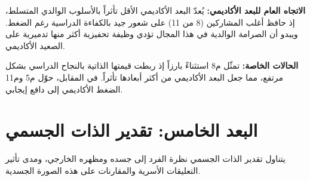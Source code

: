 \documentclass[12pt,oneside]{report}
\begin{document}
\noindent\textbf{الاتجاه العام للبعد الأكاديمي:} يُعدّ البعد الأكاديمي الأقل تأثراً بالأسلوب الوالدي المتسلط، إذ حافظ أغلب المشاركين (8 من 11) على شعور جيد بالكفاءة الدراسية رغم الضغط. ويبدو أن الصرامة الوالدية في هذا المجال تؤدي وظيفة تحفيزية أكثر منها تدميرية على الصعيد الأكاديمي.\par
\noindent\textbf{الحالات الخاصة:} تمثّل م8 استثناءً بارزاً إذ ربطت قيمتها الذاتية بالنجاح الدراسي بشكل مرتفع، مما جعل البعد الأكاديمي من أكثر أبعادها تأثراً. في المقابل، حوّل م5 وم11 الضغط الأكاديمي إلى دافع إيجابي.\par
\section{البعد الخامس: تقدير الذات الجسمي}
يتناول تقدير الذات الجسمي نظرة الفرد إلى جسده ومظهره الخارجي، ومدى تأثير التعليقات الأسرية والمقارنات على هذه الصورة الجسدية.
\end{document}
